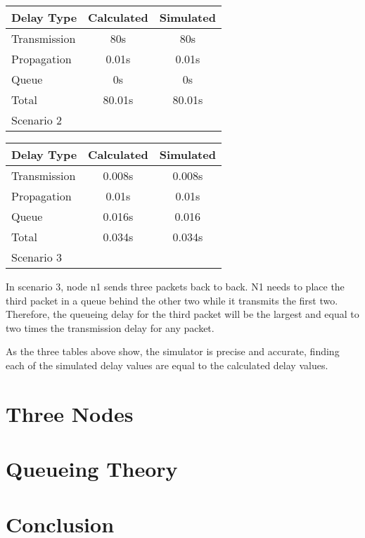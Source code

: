 \documentclass[11pt]{article}
\begin{document}
\vspace{0.5cm}
\begin{tabular}{lcc}
  \toprule
  Delay Type & Calculated & Simulated\\
  \midrule
  Transmission & 80s & 80s\\
  Propagation & 0.01s & 0.01s\\
  Queue & 0s & 0s\\
  Total & 80.01s & 80.01s\\
  \bottomrule
  Scenario 2
\end{tabular}
\vspace{0.5cm}

\vspace{0.5cm}
\begin{tabular}{lcc}
  \toprule
  Delay Type & Calculated & Simulated\\
  \midrule
  Transmission & 0.008s & 0.008s\\
  Propagation & 0.01s & 0.01s\\
  Queue & 0.016s & 0.016\\
  Total & 0.034s & 0.034s\\
  \bottomrule
  Scenario 3
\end{tabular}
\vspace{0.5cm}

In scenario 3, node n1 sends three packets back to back. N1 needs to place the third packet in a queue behind the other two while it transmits the first two. Therefore, the queueing delay for the third packet will be the largest and equal to two times the transmission delay for any packet.

As the three tables above show, the simulator is precise and accurate, finding each of the simulated delay values are equal to the calculated delay values. 

\section{Three Nodes}



\section{Queueing Theory}

\section{Conclusion}
\end{document}
